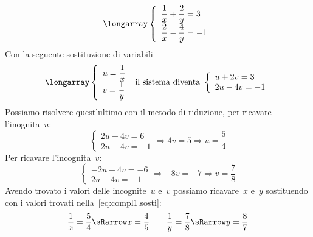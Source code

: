  \begin{esempio}
\[\longarray\left\{\begin{array}{l}
  \dfrac{1}{x}+\dfrac{2}{y}=3\\
  \dfrac{2}{x}-\dfrac{4}{y}=-1 
\end{array}\right.\]
Con la seguente sostituzione di variabili
\label{eq:compl1.sosti}
\[\longarray\left\{\begin{array}{l}
  u=\dfrac{1}{x}\\
  v=\dfrac{1}{y}
\end{array}\right.
 \text{ il sistema diventa }
\left\{\begin{array}{l}
  u+2v=3 \\
  2u-4v=-1 
\end{array}\right.\]
Possiamo risolvere quest'ultimo con il metodo di riduzione, 
per ricavare l'inognita~\(u\):
\[\left\{\begin{array}{l}
2u+4v=6 \\
2u-4v=-1
\end{array}\right. \Rightarrow 4v=5 \Rightarrow u=\frac{5}{4}\]
Per ricavare l'incognita~\(v\):
\[\left\{\begin{array}{l}
-2u-4v=-6 \\
2u-4v=-1 \end{array}\right. \Rightarrow -8v=-7 \Rightarrow v=\frac{7}{8}\]
Avendo trovato i valori delle incognite~\(u\) e~\(v\) possiamo ricavare~\(x\) 
e~\(y\) sostituendo con i valori trovati nella~\ref{eq:compl1.sosti}:
\[\dfrac{1}{x}=\dfrac{5}{4} \sRarrow x=\dfrac{4}{5} \qquad
  \dfrac{1}{y}=\dfrac{7}{8} \sRarrow y=\dfrac{8}{7}\]
 \end{esempio}

